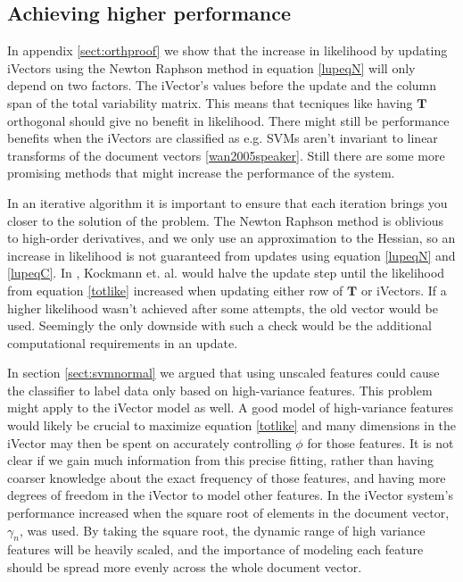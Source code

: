 \subsection{Achieving higher performance}
\label{sect:higherlike}

In appendix \ref{sect:orthproof} we show that the increase in likelihood by updating iVectors using the Newton Raphson method in equation \ref{lupeqN} will only depend on two factors. The iVector's values before the update and the column span of the total variability matrix. This means that tecniques like having $\mathbf{T}$ orthogonal should give no benefit in likelihood. There might still be performance benefits when the iVectors are classified as e.g. SVMs aren't invariant to linear transforms of the document vectors \ref{wan2005speaker}. Still there are some more promising methods that might increase the performance of the system.

In an iterative algorithm it is important to ensure that each iteration brings you closer to the solution of the problem. The Newton Raphson method is oblivious to high-order derivatives, and we only use an approximation to the Hessian, so an increase in likelihood is not guaranteed from updates using equation \ref{lupeqN} and \ref{lupeqC}. In \cite{kockmann2010prosodic}, Kockmann et. al. would halve the update step until the likelihood from equation \ref{totlike} increased when updating either row of $\mathbf{T}$ or iVectors. If a higher likelihood wasn't achieved after some attempts, the old vector would be used.  Seemingly the only downside with such a check would be the additional computational requirements in an update.

In section \ref{sect:svmnormal} we argued that using unscaled features could cause the classifier to label data only based on high-variance features. This problem might apply to the iVector model as well. A good model of high-variance features would likely be crucial to maximize equation \ref{totlike} and many dimensions in the iVector may then be spent on accurately controlling $\phi$ for those features. It is not clear if we gain much information from this precise fitting, rather than having coarser knowledge about the exact frequency of those features, and having more degrees of freedom in the iVector to model other features. In \cite{soufifar2011ivector} the iVector system's performance increased when the square root of elements in the document vector, $\gamma_n$, was used. By taking the square root, the dynamic range of high variance features will be heavily scaled, and the importance of modeling each feature should be spread more evenly across the whole document vector.

